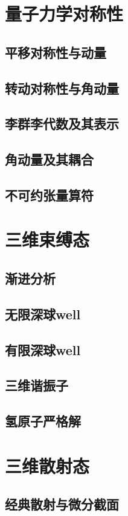 \documentclass[a4paper,11pt]{article}
\begin{document}
\section{量子力学对称性}
\subsection{平移对称性与动量}
\subsection{转动对称性与角动量}
\subsection{李群李代数及其表示}
\subsection{角动量及其耦合}
\subsection{不可约张量算符}
\section{三维束缚态}
\subsection{渐进分析}
\subsection{无限深球well}
\subsection{有限深球well}
\subsection{三维谐振子}
\subsection{氢原子严格解}
\section{三维散射态}
\subsection{经典散射与微分截面}
\end{document}
